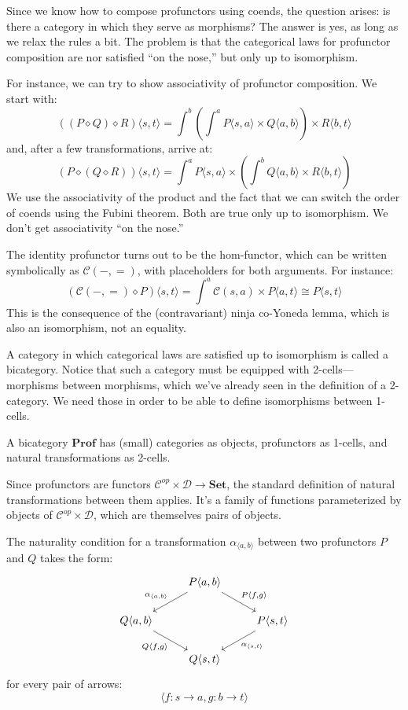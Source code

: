 \documentclass[DaoFP]{subfiles}
\begin{document}
Since we know how to compose profunctors using coends, the question arises: is there a category in which they serve as morphisms? The answer is yes, as long as we relax the rules a bit. The problem is that the categorical laws for profunctor composition are nor satisfied ``on the nose,'' but only up to isomorphism. 

For instance, we can try to show associativity of profunctor composition. We start with:
\[ ((P \diamond Q) \diamond R) \langle s, t \rangle = \int^b \left( \int^a P \langle s, a \rangle \times Q \langle a, b \rangle \right) \times R \langle b,  t \rangle \]
and, after a few transformations, arrive at:
\[ (P \diamond (Q \diamond R)) \langle s, t \rangle =  \int^a P \langle s, a \rangle \times \left( \int^b Q \langle a, b \rangle \times R \langle b,  t \rangle \right) \]
We use the associativity of the product and the fact that we can switch the order of coends using the Fubini theorem. Both are true only up to isomorphism. We don't get associativity ``on the nose.''

The identity profunctor turns out to be the hom-functor, which can be written symbolically as $\mathcal{C}(-, =)$, with placeholders for both arguments. For instance:
\[ \left( \mathcal{C}(-, =) \diamond P \right) \langle s, t \rangle = \int^a  \mathcal{C}(s, a) \times P \langle a, t \rangle \cong P \langle s, t \rangle \]
This is the consequence of the (contravariant) ninja co-Yoneda lemma, which is also an isomorphism, not an equality.

A category in which categorical laws are satisfied up to isomorphism is called a bicategory. Notice that such a category must be equipped with 2-cells---morphisms between morphisms, which we've already seen in the definition of a 2-category. We need those in order to be able to define isomorphisms between 1-cells. 

A bicategory $\mathbf{Prof}$ has (small) categories as objects, profunctors as 1-cells, and natural transformations as 2-cells. 

Since profunctors are functors $\mathcal{C}^{op} \times  \mathcal{D} \to \mathbf{Set}$, the standard definition of natural transformations between them applies. It's a family of functions parameterized by objects of $\mathcal{C}^{op} \times  \mathcal{D}$, which are themselves pairs of objects. 

The naturality condition for a transformation $\alpha_{\langle a, b \rangle}$ between two profunctors $P$ and $Q$ takes the form:
\[
 \begin{tikzcd}
 &P \langle a, b \rangle
 \arrow[ld, "{\alpha_{\langle a, b \rangle}}"']
 \arrow[rd, "{P \langle f, g \rangle}"]
 \\
 Q \langle a, b \rangle
 \arrow[dr, "{Q \langle f, g \rangle}"']
 &&P \langle s, t \rangle
 \arrow[dl, "{\alpha_{\langle s, t \rangle}}"]
 \\
 & Q \langle s, t \rangle
 \end{tikzcd}
\]
for every pair of arrows:
\[ \langle f \colon s \to a, g \colon b \to t \rangle \]
\end{document}
